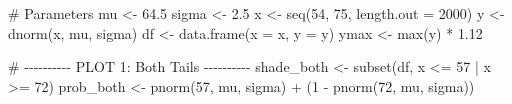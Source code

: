 \documentclass[
  letterpaper,
  DIV=11,
  numbers=noendperiod]{scrreprt}
\newenvironment{Shaded}{\begin{snugshade}}{\end{snugshade}}
\newcommand{\AttributeTok}[1]{\textcolor[rgb]{0.40,0.45,0.13}{#1}}
\newcommand{\CommentTok}[1]{\textcolor[rgb]{0.37,0.37,0.37}{#1}}
\newcommand{\DecValTok}[1]{\textcolor[rgb]{0.68,0.00,0.00}{#1}}
\newcommand{\FloatTok}[1]{\textcolor[rgb]{0.68,0.00,0.00}{#1}}
\newcommand{\FunctionTok}[1]{\textcolor[rgb]{0.28,0.35,0.67}{#1}}
\newcommand{\NormalTok}[1]{\textcolor[rgb]{0.00,0.23,0.31}{#1}}
\newcommand{\OtherTok}[1]{\textcolor[rgb]{0.00,0.23,0.31}{#1}}
\newcommand{\SpecialCharTok}[1]{\textcolor[rgb]{0.37,0.37,0.37}{#1}}
\begin{document}
\begin{Shaded}
\begin{Highlighting}[]
\CommentTok{\# Parameters}
\NormalTok{mu }\OtherTok{\textless{}{-}} \FloatTok{64.5}
\NormalTok{sigma }\OtherTok{\textless{}{-}} \FloatTok{2.5}
\NormalTok{x }\OtherTok{\textless{}{-}} \FunctionTok{seq}\NormalTok{(}\DecValTok{54}\NormalTok{, }\DecValTok{75}\NormalTok{, }\AttributeTok{length.out =} \DecValTok{2000}\NormalTok{)}
\NormalTok{y }\OtherTok{\textless{}{-}} \FunctionTok{dnorm}\NormalTok{(x, mu, sigma)}
\NormalTok{df }\OtherTok{\textless{}{-}} \FunctionTok{data.frame}\NormalTok{(}\AttributeTok{x =}\NormalTok{ x, }\AttributeTok{y =}\NormalTok{ y)}
\NormalTok{ymax }\OtherTok{\textless{}{-}} \FunctionTok{max}\NormalTok{(y) }\SpecialCharTok{*} \FloatTok{1.12}

\CommentTok{\# {-}{-}{-}{-}{-}{-}{-}{-}{-}{-} PLOT 1: Both Tails {-}{-}{-}{-}{-}{-}{-}{-}{-}{-}}
\NormalTok{shade\_both }\OtherTok{\textless{}{-}} \FunctionTok{subset}\NormalTok{(df, x }\SpecialCharTok{\textless{}=} \DecValTok{57} \SpecialCharTok{|}\NormalTok{ x }\SpecialCharTok{\textgreater{}=} \DecValTok{72}\NormalTok{)}
\NormalTok{prob\_both }\OtherTok{\textless{}{-}} \FunctionTok{pnorm}\NormalTok{(}\DecValTok{57}\NormalTok{, mu, sigma) }\SpecialCharTok{+}\NormalTok{ (}\DecValTok{1} \SpecialCharTok{{-}} \FunctionTok{pnorm}\NormalTok{(}\DecValTok{72}\NormalTok{, mu, sigma))}


\end{Highlighting}
\end{Shaded}
\end{document}
